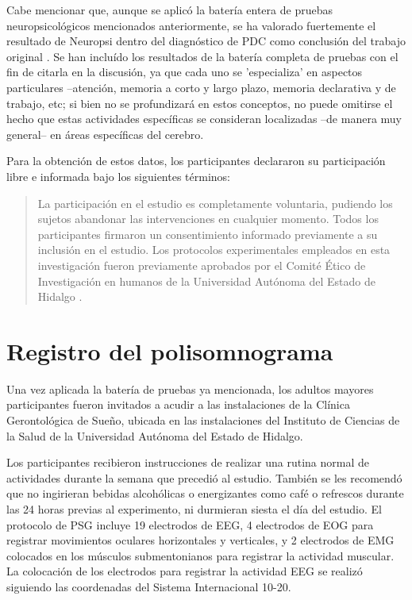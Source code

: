 \documentclass[12pt,a4paper]{mitthesis}
\begin{document}
Cabe mencionar que, aunque se aplic\'o la bater\'ia entera de pruebas 
neuropsicol\'ogicos mencionados
anteriormente, se ha valorado fuertemente el resultado de Neuropsi dentro del diagn\'ostico de PDC
como conclusi\'on del trabajo original \cite{VazquezTagle16}.
Se han inclu\'ido los resultados de la bater\'ia completa de pruebas con el fin de citarla en la 
discusi\'on, ya que cada uno se 'especializa' en aspectos particulares --atenci\'on, memoria a 
corto y largo plazo, memoria declarativa y de trabajo, etc; si bien no se profundizar\'a en estos
conceptos, no puede omitirse el hecho que estas actividades espec\'ificas se consideran localizadas 
--de manera muy general-- en \'areas espec\'ificas del cerebro.

Para la obtenci\'on de estos datos, los participantes declararon su participaci\'on libre e 
informada bajo los siguientes t\'erminos:
\begin{quote}
La participaci\'on en el estudio es completamente voluntaria, pudiendo los sujetos abandonar las 
intervenciones en cualquier momento. Todos los participantes firmaron un consentimiento informado 
previamente a su inclusi\'on en el estudio. 
Los protocolos experimentales empleados en esta investigaci\'on fueron previamente aprobados por 
el Comit\'e \'Etico de Investigaci\'on en humanos de la Universidad Autónoma del Estado de Hidalgo
\cite{VazquezTagle16}.
\end{quote}


\section{Registro del polisomnograma}

Una vez aplicada la bater\'ia de pruebas ya mencionada, los adultos mayores participantes fueron 
invitados a acudir a las instalaciones de la Cl\'inica Gerontol\'ogica de Sue\~no, ubicada en las 
instalaciones del Instituto de Ciencias de la Salud de la Universidad Aut\'onoma del Estado de 
Hidalgo.

Los participantes recibieron instrucciones de realizar una rutina normal de actividades durante la 
semana que precedi\'o al estudio. Tambi\'en se les recomend\'o que no ingirieran bebidas 
alcoh\'olicas o energizantes como caf\'e o refrescos durante las 24 horas previas al experimento, 
ni durmieran siesta el d\'ia del estudio. 
El protocolo de PSG incluye 19 electrodos de EEG, 4 electrodos de EOG para registrar movimientos 
oculares horizontales y verticales, y 2 electrodos de EMG colocados en los m\'usculos 
submentonianos para registrar la actividad muscular. 
La colocaci\'on de los electrodos para registrar la actividad EEG se realiz\'o siguiendo las 
coordenadas del Sistema Internacional 10-20\cite{Coleman87}.
\end{document}
